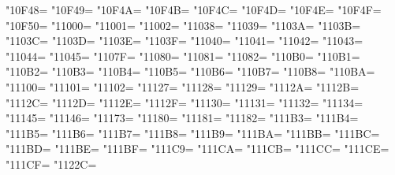 \XeTeXcharclass"10F48=\KclassCM
\XeTeXcharclass"10F49=\KclassCM
\XeTeXcharclass"10F4A=\KclassCM
\XeTeXcharclass"10F4B=\KclassCM
\XeTeXcharclass"10F4C=\KclassCM
\XeTeXcharclass"10F4D=\KclassCM
\XeTeXcharclass"10F4E=\KclassCM
\XeTeXcharclass"10F4F=\KclassCM
\XeTeXcharclass"10F50=\KclassCM
\XeTeXcharclass"11000=\KclassCM
\XeTeXcharclass"11001=\KclassCM
\XeTeXcharclass"11002=\KclassCM
\XeTeXcharclass"11038=\KclassCM
\XeTeXcharclass"11039=\KclassCM
\XeTeXcharclass"1103A=\KclassCM
\XeTeXcharclass"1103B=\KclassCM
\XeTeXcharclass"1103C=\KclassCM
\XeTeXcharclass"1103D=\KclassCM
\XeTeXcharclass"1103E=\KclassCM
\XeTeXcharclass"1103F=\KclassCM
\XeTeXcharclass"11040=\KclassCM
\XeTeXcharclass"11041=\KclassCM
\XeTeXcharclass"11042=\KclassCM
\XeTeXcharclass"11043=\KclassCM
\XeTeXcharclass"11044=\KclassCM
\XeTeXcharclass"11045=\KclassCM
\XeTeXcharclass"1107F=\KclassCM
\XeTeXcharclass"11080=\KclassCM
\XeTeXcharclass"11081=\KclassCM
\XeTeXcharclass"11082=\KclassCM
\XeTeXcharclass"110B0=\KclassCM
\XeTeXcharclass"110B1=\KclassCM
\XeTeXcharclass"110B2=\KclassCM
\XeTeXcharclass"110B3=\KclassCM
\XeTeXcharclass"110B4=\KclassCM
\XeTeXcharclass"110B5=\KclassCM
\XeTeXcharclass"110B6=\KclassCM
\XeTeXcharclass"110B7=\KclassCM
\XeTeXcharclass"110B8=\KclassCM
\XeTeXcharclass"110BA=\KclassCM
\XeTeXcharclass"11100=\KclassCM
\XeTeXcharclass"11101=\KclassCM
\XeTeXcharclass"11102=\KclassCM
\XeTeXcharclass"11127=\KclassCM
\XeTeXcharclass"11128=\KclassCM
\XeTeXcharclass"11129=\KclassCM
\XeTeXcharclass"1112A=\KclassCM
\XeTeXcharclass"1112B=\KclassCM
\XeTeXcharclass"1112C=\KclassCM
\XeTeXcharclass"1112D=\KclassCM
\XeTeXcharclass"1112E=\KclassCM
\XeTeXcharclass"1112F=\KclassCM
\XeTeXcharclass"11130=\KclassCM
\XeTeXcharclass"11131=\KclassCM
\XeTeXcharclass"11132=\KclassCM
\XeTeXcharclass"11134=\KclassCM
\XeTeXcharclass"11145=\KclassCM
\XeTeXcharclass"11146=\KclassCM
\XeTeXcharclass"11173=\KclassCM
\XeTeXcharclass"11180=\KclassCM
\XeTeXcharclass"11181=\KclassCM
\XeTeXcharclass"11182=\KclassCM
\XeTeXcharclass"111B3=\KclassCM
\XeTeXcharclass"111B4=\KclassCM
\XeTeXcharclass"111B5=\KclassCM
\XeTeXcharclass"111B6=\KclassCM
\XeTeXcharclass"111B7=\KclassCM
\XeTeXcharclass"111B8=\KclassCM
\XeTeXcharclass"111B9=\KclassCM
\XeTeXcharclass"111BA=\KclassCM
\XeTeXcharclass"111BB=\KclassCM
\XeTeXcharclass"111BC=\KclassCM
\XeTeXcharclass"111BD=\KclassCM
\XeTeXcharclass"111BE=\KclassCM
\XeTeXcharclass"111BF=\KclassCM
\XeTeXcharclass"111C9=\KclassCM
\XeTeXcharclass"111CA=\KclassCM
\XeTeXcharclass"111CB=\KclassCM
\XeTeXcharclass"111CC=\KclassCM
\XeTeXcharclass"111CE=\KclassCM
\XeTeXcharclass"111CF=\KclassCM
\XeTeXcharclass"1122C=\KclassCM
